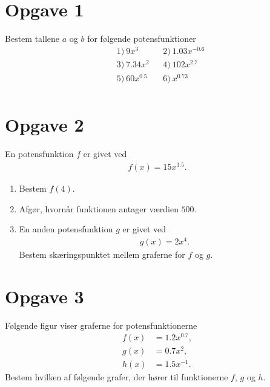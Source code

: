 \section*{Opgave 1}
Bestem tallene $a$ og $b$ for følgende potensfunktioner
\begin{align*}
	&1) \ 9x^3   &&2) \ 1.03x^{-0.6}   \\
	&3) \ 7.34x^2   &&4) \ 102x^{2.7}   \\
	&5) \ 60x^{0.5}   &&6) \  x^{0.73}  \\
\end{align*}

\section*{Opgave 2}

En potensfunktion $f$ er givet ved 
\begin{align*}
	f(x) = 15x^{3.5}.
\end{align*}
\begin{enumerate}[label=\roman*)]
	\item Bestem $f(4)$. 
	\item Afgør, hvornår funktionen antager værdien $500$.
	\item En anden potensfunktion $g$ er givet ved
	\begin{align*}
		g(x) = 2x^4.
	\end{align*}
	Bestem skæringspunktet mellem graferne for $f$ og $g$. 
\end{enumerate}

\section*{Opgave 3}
Følgende figur viser graferne for potensfunktionerne 
\begin{align*}
	f(x) &= 1.2x^{0.7},\\
	g(x) &= 0.7x^2,\\
	h(x) &= 1.5x^{-1}.
\end{align*}
Bestem hvilken af følgende grafer, der hører til funktionerne $f$, $g$ og $h$. 
\begin{center}
\end{center}
